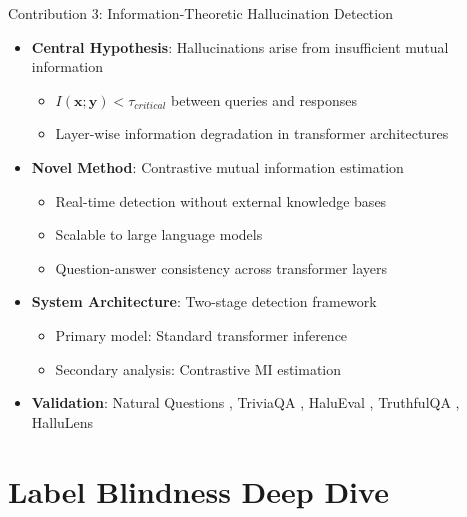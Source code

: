 \documentclass[aspectratio=169]{beamer}
\newcommand{\sectionpubinfo}{}
\begin{document}
\begin{frame}{Contribution 3: Information-Theoretic Hallucination Detection}
\begin{itemize}
    \item \textbf{Central Hypothesis}: Hallucinations arise from insufficient mutual information
    \begin{itemize}
        \item $I(\mathbf{x}; \mathbf{y}) < \tau_{critical}$ between queries and responses
        \item Layer-wise information degradation in transformer architectures
    \end{itemize}
    \item \textbf{Novel Method}: Contrastive mutual information estimation
    \begin{itemize}
        \item Real-time detection without external knowledge bases
        \item Scalable to large language models \citep{brown2020language,devlin2018bert,raffel2020exploring}
        \item Question-answer consistency across transformer layers \citep{vaswani2017attention}
    \end{itemize}
    \item \textbf{System Architecture}: Two-stage detection framework
    \begin{itemize}
        \item Primary model: Standard transformer inference
        \item Secondary analysis: Contrastive MI estimation
    \end{itemize}
    \item \textbf{Validation}: Natural Questions \citep{kwiatkowski2019natural}, TriviaQA \citep{joshi2017triviaqa}, HaluEval \citep{li2023halueval}, TruthfulQA \citep{lin2022truthfulqa}, HalluLens \citep{bang2025hallulens}
\end{itemize}
\end{frame}


\renewcommand{\sectionpubinfo}{\hspace{1ex}(Published at ICLR 2025)}
\section{Label Blindness Deep Dive}
\end{document}
